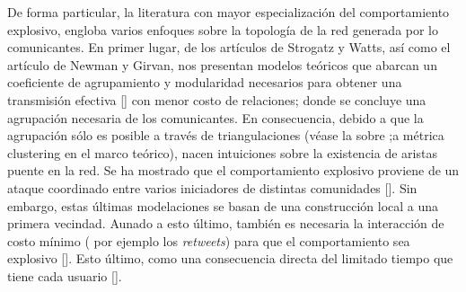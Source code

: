 \documentclass[../main.tex]{subfiles}
\begin{document}
De forma particular, la literatura con mayor especialización del comportamiento explosivo, engloba varios enfoques sobre la topología de la red generada por lo comunicantes. En primer lugar, de los artículos de Strogatz y Watts, así como el artículo de Newman  y  Girvan, nos presentan modelos teóricos que abarcan un coeficiente de agrupamiento y modularidad necesarios para obtener una transmisión efectiva [\cite{Watts1998,Nematzadeh2014}] con menor costo de relaciones; donde se concluye una agrupación necesaria de los comunicantes. En consecuencia, debido a que la agrupación sólo es posible a través de triangulaciones (véase la sobre ;a métrica clustering en el marco teórico), nacen intuiciones sobre la existencia de aristas puente en la red.
Se ha mostrado que el comportamiento explosivo proviene de un ataque coordinado entre varios iniciadores de distintas comunidades [\cite{D_weng2014predicting,D_Weng2013, Lerman2016}]. Sin embargo, estas últimas modelaciones se basan de una construcción local a una primera vecindad. Aunado a esto último, también es necesaria la interacción de costo mínimo ( por ejemplo los \textit{retweets}) para que el comportamiento sea explosivo  [\cite{Model_Fabrega_regresion,Model_retweets_inproceedings}]. Esto último, como una consecuencia directa del limitado tiempo que tiene cada usuario [\cite{Miritello2013}].
\end{document}
